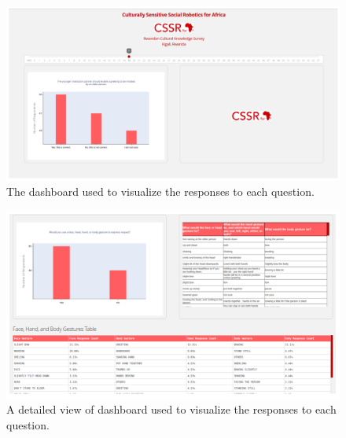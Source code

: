\documentclass{CSSRforAfrica}
\begin{document}
\begin{figure}[t]
\begin{center}
\includegraphics[width=120mm,angle=0]{dashboard1.png}
\end{center}
\vspace{-5mm}
\caption{The dashboard used to visualize the responses to each question.}
\label{fig:dashboard1}       
\end{figure}

\begin{figure}[tb]
\begin{center}
\includegraphics[width=120mm,angle=0]{dashboard2.png}
\end{center}
\vspace{-5mm}
\caption{A detailed view of dashboard used to visualize the responses to each question.}
\label{fig:dashboard2}       
\end{figure}
\end{document}
